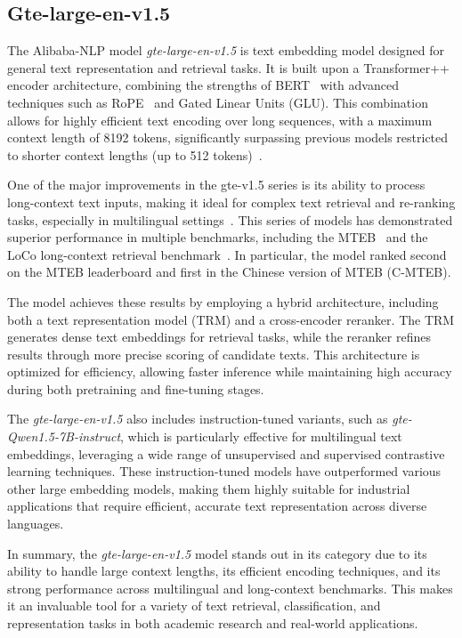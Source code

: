 \subsection{Gte-large-en-v1.5}\label{subsec:alibaba-nlp}
The Alibaba-NLP model \textit{gte-large-en-v1.5} is text embedding model designed for general text representation and retrieval tasks.
It is built upon a Transformer++ encoder architecture, combining the strengths of BERT~\cite{devlin2019bertpretrainingdeepbidirectional} with advanced techniques such as \ac{RoPE}~\cite{su2023roformerenhancedtransformerrotary} and Gated Linear Units (GLU).
This combination allows for highly efficient text encoding over long sequences, with a maximum context length of 8192 tokens, significantly surpassing previous models restricted to shorter context lengths (up to 512 tokens)~\cite{zhang2024mgtegeneralizedlongcontexttext}.

One of the major improvements in the gte-v1.5 series is its ability to process long-context text inputs, making it ideal for complex text retrieval and re-ranking tasks, especially in multilingual settings~\cite{li2023generaltextembeddingsmultistage}.
This series of models has demonstrated superior performance in multiple benchmarks, including the \ac{MTEB}~\cite{muennighoff-etal-2023-mteb} and the LoCo long-context retrieval benchmark~\cite{saadfalcon2024benchmarkingbuildinglongcontextretrieval}.
In particular, the model ranked second on the MTEB leaderboard and first in the Chinese version of MTEB (C-MTEB).

The model achieves these results by employing a hybrid architecture, including both a text representation model (TRM) and a cross-encoder reranker.
The TRM generates dense text embeddings for retrieval tasks, while the reranker refines results through more precise scoring of candidate texts.
This architecture is optimized for efficiency, allowing faster inference while maintaining high accuracy during both pretraining and fine-tuning stages.

The \textit{gte-large-en-v1.5} also includes instruction-tuned variants, such as \textit{gte-Qwen1.5-7B-instruct}, which is particularly effective for multilingual text embeddings, leveraging a wide range of unsupervised and supervised contrastive learning techniques.
These instruction-tuned models have outperformed various other large embedding models, making them highly suitable for industrial applications that require efficient, accurate text representation across diverse languages.

In summary, the \textit{gte-large-en-v1.5} model stands out in its category due to its ability to handle large context lengths, its efficient encoding techniques, and its strong performance across multilingual and long-context benchmarks.
This makes it an invaluable tool for a variety of text retrieval, classification, and representation tasks in both academic research and real-world applications.

